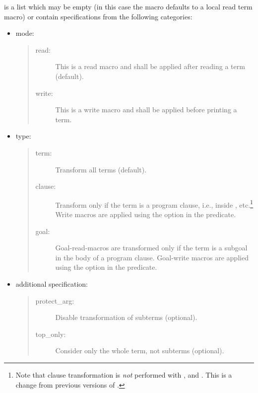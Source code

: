  is a list which may be empty (in this case the macro defaults
to a local read term macro) or contain specifications from
the following categories:
\begin{itemize}

\item mode:
  \begin{quote}
  \begin{description}

  \item[read:]
    This is a read macro and shall be applied after reading a term (default).

  \item[write:]
    This is a write macro and shall be applied before printing a term.
  \end{description}
  \end{quote}

\item type:
  \begin{quote}
  \begin{description}

  \item[term:]
    Transform all terms (default).

  \item[clause:]
    Transform only if the term is a program clause, i.e., inside
    ,
    etc.\footnote{%
      Note that clause transformation is {\em not} performed with
      ,
       and
      . This is a change
      from previous versions of \eclipse.}
    Write macros are applied using the  option in the
     predicate.

  \item[goal:]
    Goal-read-macros are transformed only if the term is a subgoal in the body
    of a program clause.
    Goal-write macros are applied using the  option in the
     predicate.
  \end{description}
  \end{quote}

\item additional specification:
  \begin{quote}
  \begin{description}

  \item[protect_arg:]
    Disable transformation of subterms (optional).

  \item[top_only:]
    Consider only the whole term, not subterms (optional).
  \end{description}
  \end{quote}
\end{itemize}
